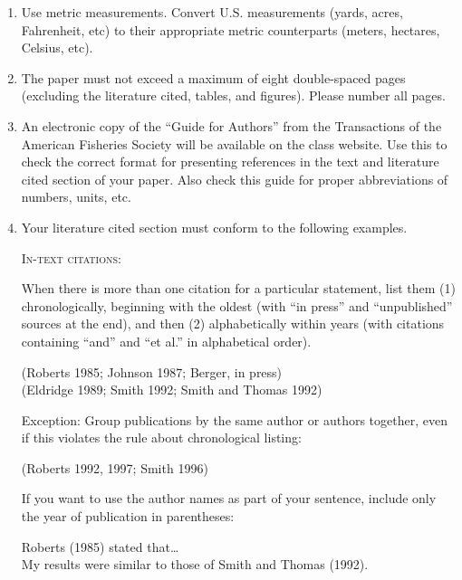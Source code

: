 \documentclass[12pt]{article}
\begin{document}
\begin{enumerate}
	\item Use metric measurements.  Convert U.S. measurements (yards, acres, Fahrenheit, etc) to their appropriate metric counterparts (meters, hectares, Celsius, etc).

	\item The paper must not exceed a maximum of eight double-spaced pages (excluding the literature cited, tables, and figures). Please number all pages.
	
	\item An electronic copy of the “Guide for Authors” from the Transactions of the American Fisheries Society will be available on the class website. Use this to check the correct format for presenting references in the text and literature cited section of your paper. Also check this guide for proper abbreviations of numbers, units, etc.
	
	\item Your literature cited section must conform to the following examples.
	
	\medskip
	
	\textsc{In-text citations:}
	
	When there is more than one citation for a particular statement, list them (1) chronologically, beginning with the oldest (with “in press” and “unpublished” sources at the end), and then (2) alphabetically within years (with citations containing “and” and “et al.” in alphabetical order).

	
	(Roberts 1985; Johnson 1987; Berger, in press)\\
	(Eldridge 1989; Smith 1992; Smith and Thomas 1992)
	
	
	Exception: Group publications by the same author or authors together, even if this violates the rule about chronological listing:
	
	
	(Roberts 1992, 1997; Smith 1996)
	
	\medskip
	
	If you want to use the author names as part of your sentence, include only the year of publication in parentheses:
	
	
	Roberts (1985) stated that\dots \\
	My results were similar to those of Smith and Thomas (1992).

	\medskip
	

\end{enumerate}
\end{document}
